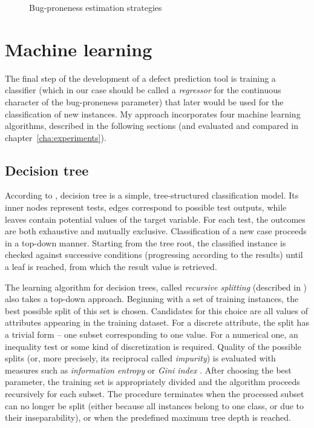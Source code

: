 \documentclass{pracamgr}
\begin{document}
\begin{figure}[h]
\centering

\caption{Bug-proneness estimation strategies}
\label{fig:bug_proneness_strategies}
\end{figure}

\section{Machine learning}
\label{sec:machine_learning}
The final step of the development of a defect prediction tool is training a classifier (which in our case should be called a \emph{regressor} for the continuous character of the bug-proneness parameter) that later would be used for the classification of new instances. My approach incorporates four machine learning algorithms, described in the following sections (and evaluated and compared in chapter~\ref{cha:experiments}).

\subsection{Decision tree}
\label{sec:decision_tree}
According to \cite[p. 263]{encyclopedia}, decision tree is a simple, tree-structured classification model. Its inner nodes represent tests, edges correspond to possible test outputs, while leaves contain potential values of the target variable. For each test, the outcomes are both exhaustive and mutually exclusive. Classification of a new case proceeds in a top-down manner. Starting from the tree root, the classified instance is checked against successive conditions (progressing according to the results) until a leaf is reached, from which the result value is retrieved.

The learning algorithm for decision trees, called \emph{recursive splitting} (described in \cite[p.~264]{encyclopedia}) also takes a top-down approach. Beginning with a set of training instances, the best possible split of this set is chosen. Candidates for this choice are all values of attributes appearing in the training dataset. For a discrete attribute, the split has a trivial form -- one subset corresponding to one value. For a numerical one, an inequality test or some kind of discretization is required. Quality of the possible splits (or, more precisely, its reciprocal called \emph{impurity}) is evaluated with measures such as \emph{information entropy} \cite{Shannon} or \emph{Gini index} \cite{Gini}. After choosing the best parameter, the training set is appropriately divided and the algorithm proceeds recursively for each subset. The procedure terminates when the processed subset can no longer be split (either because all instances belong to one class, or due to their inseparability), or when the predefined maximum tree depth is reached.
\end{document}
